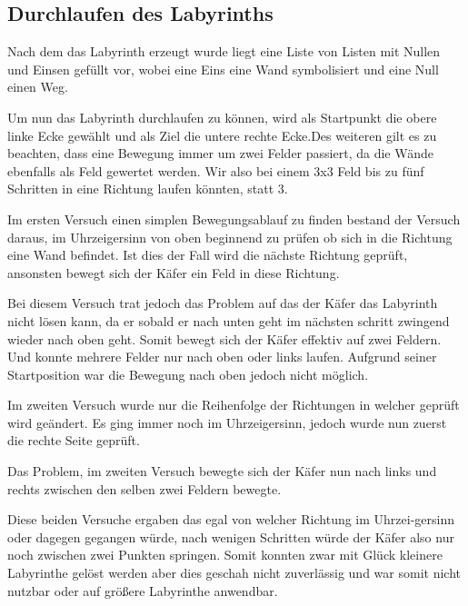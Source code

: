 \documentclass[12pt, a4paper, titlepage]{article}
\begin{document}
\subsection{Durchlaufen des Labyrinths}

Nach dem das Labyrinth erzeugt wurde liegt eine Liste von Listen mit Nullen und Einsen gefüllt vor, wobei eine Eins eine Wand symbolisiert und eine Null einen Weg.


\bigskip

Um nun das Labyrinth durchlaufen zu können, wird als Startpunkt die obere linke Ecke gewählt und als Ziel die untere rechte Ecke.Des weiteren gilt es zu beachten, dass eine Bewegung immer um zwei Felder passiert, da die Wände ebenfalls als Feld gewertet werden.
Wir also bei einem 3x3 Feld bis zu fünf Schritten in eine Richtung laufen könnten, statt 3.

\bigskip

Im ersten Versuch einen simplen Bewegungsablauf zu finden bestand der Versuch daraus, im Uhrzeigersinn von oben beginnend zu prüfen ob sich in die Richtung eine Wand befindet.
Ist dies der Fall wird die nächste Richtung geprüft, ansonsten bewegt sich der Käfer ein Feld in diese Richtung.


Bei diesem Versuch trat jedoch das Problem auf das der Käfer das Labyrinth nicht lösen kann, da er sobald er nach unten geht im nächsten schritt zwingend wieder nach oben geht.
Somit bewegt sich der Käfer effektiv auf zwei Feldern.
Und konnte mehrere Felder nur nach oben oder links laufen.
Aufgrund seiner Startposition war die Bewegung nach oben jedoch nicht möglich.

\bigskip

Im zweiten Versuch wurde nur die Reihenfolge der Richtungen in welcher geprüft wird geändert.
Es ging immer noch im Uhrzeigersinn, jedoch wurde nun zuerst die rechte Seite geprüft.

Das Problem, im zweiten Versuch bewegte sich der Käfer nun nach links und rechts zwischen den selben zwei Feldern bewegte.


\bigskip

Diese beiden Versuche ergaben das egal von welcher Richtung im Uhrzei-gersinn oder dagegen gegangen würde, nach wenigen Schritten würde der Käfer also nur noch zwischen zwei Punkten springen.
Somit konnten zwar mit Glück kleinere Labyrinthe gelöst werden aber dies geschah nicht zuverlässig und war somit nicht nutzbar oder auf größere Labyrinthe anwendbar.

\bigskip
\end{document}
